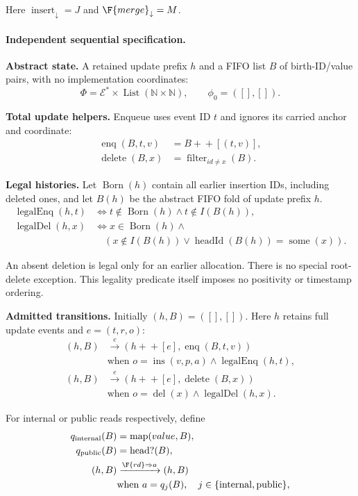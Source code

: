 Here $\operatorname{insert}_{\downarrow}=J$ and $\F{merge}_{\downarrow}=M$.


\paragraph{Independent sequential specification.}
\textbf{Abstract state.} A retained update prefix $h$ and a FIFO list $B$ of birth-ID/value pairs,
with no implementation coordinates:
\[
\Phi=\mathcal E^*\times\operatorname{List}(\mathbb N\times\mathbb N),\qquad\phi_0=([],[]).
\]

\textbf{Total update helpers.} Enqueue uses event ID $t$ and ignores its carried anchor and coordinate:
\[
\begin{aligned}\operatorname{enq}(B,t,v)&=B+\!+[(t,v)],\\\operatorname{delete}(B,x)&=\operatorname{filter}_{id\ne x}(B).\end{aligned}
\]


\textbf{Legal histories.} Let $\operatorname{Born}(h)$ contain all earlier insertion IDs, including deleted ones, and let $B(h)$ be the abstract FIFO fold of update prefix $h$.
\[
\begin{aligned}\operatorname{legalEnq}(h,t)&\iff t\notin\operatorname{Born}(h)\land t\notin I(B(h)),\\\operatorname{legalDel}(h,x)&\iff x\in\operatorname{Born}(h)\land\\&\quad(x\notin I(B(h))\lor\operatorname{headId}(B(h))=\operatorname{some}(x)).\end{aligned}
\]

An absent deletion is legal only for an earlier allocation. There is no special root-delete exception. This legality predicate itself imposes no positivity or timestamp ordering.

\textbf{Admitted transitions.} Initially $(h,B)=([],[])$. Here $h$ retains full update events and $e=(t,r,o)$:
\[
\begin{aligned}(h,B)&\xrightarrow{e}(h+\!+[e],\operatorname{enq}(B,t,v))\\&\text{when }o=\operatorname{ins}(v,p,a)\land\operatorname{legalEnq}(h,t),\\(h,B)&\xrightarrow{e}(h+\!+[e],\operatorname{delete}(B,x))\\&\text{when }o=\operatorname{del}(x)\land\operatorname{legalDel}(h,x).\end{aligned}
\]

For internal or public reads respectively, define
\[
\begin{aligned}q_{\mathrm{internal}}(B)&=\operatorname{map}(value,B),\\q_{\mathrm{public}}(B)&=\operatorname{head?}(B),\\(h,B)&\xrightarrow{\F{rd}\Rightarrow a}(h,B)\\&\text{when }a=q_j(B),\quad j\in\{\mathrm{internal},\mathrm{public}\},\end{aligned}
\]

